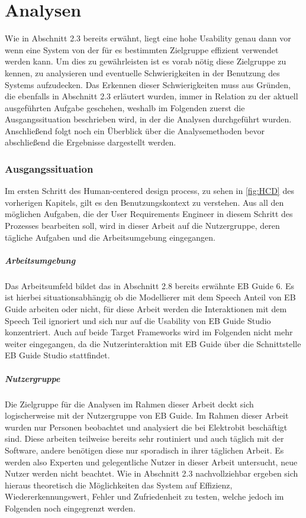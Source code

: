 \chapter{Analysen}\label{ch:method}

Wie in Abschnitt 2.3 bereits erwähnt, liegt eine hohe Usability genau dann vor wenn eine System von der für es bestimmten Zielgruppe effizient verwendet werden kann.\cite{Richter.2016}
Um dies zu gewährleisten ist es vorab nötig diese Zielgruppe zu kennen, zu analysieren und eventuelle Schwierigkeiten in der Benutzung des Systems aufzudecken.
Das Erkennen dieser Schwierigkeiten muss aus Gründen, die ebenfalls in Abschnitt 2.3 erläutert wurden, immer in Relation zu der aktuell ausgeführten Aufgabe geschehen, weshalb im Folgenden zuerst die Ausgangssituation beschrieben wird, in der die Analysen durchgeführt wurden.
Anschließend folgt noch ein Überblick über die Analysemethoden bevor abschließend die Ergebnisse dargestellt werden.

\subsection{Ausgangssituation}
Im ersten Schritt des Human-centered design process, zu sehen in \cref{fig:HCD} des vorherigen Kapitels, gilt es den Benutzungskontext zu verstehen.
Aus all den möglichen Aufgaben, die der User Requirements Engineer in diesem Schritt des Prozesses bearbeiten soll, wird in dieser Arbeit auf die Nutzergruppe, deren tägliche Aufgaben und die Arbeitsumgebung eingegangen.

\paragraph{Arbeitsumgebung}
Das Arbeitsumfeld bildet das in Abschnitt 2.8 bereits erwähnte EB Guide 6.
Es ist hierbei situationsabhängig ob die Modellierer mit dem Speech Anteil von EB Guide arbeiten oder nicht, für diese Arbeit werden die Interaktionen mit dem Speech Teil ignoriert und sich nur auf die Usability von EB Guide Studio konzentriert.
Auch auf beide Target Frameworks wird im Folgenden nicht mehr weiter eingegangen, da die Nutzerinteraktion mit EB Guide über die Schnittstelle EB Guide Studio stattfindet.

\paragraph{Nutzergruppe}
Die Zielgruppe für die Analysen im Rahmen dieser Arbeit deckt sich logischerweise mit der Nutzergruppe von EB Guide.
Im Rahmen dieser Arbeit wurden nur Personen beobachtet und analysiert die bei Elektrobit beschäftigt sind.
Diese arbeiten teilweise bereits sehr routiniert und auch täglich mit der Software, andere benötigen diese nur sporadisch in ihrer täglichen Arbeit.
Es werden also Experten und gelegentliche Nutzer in dieser Arbeit untersucht, neue Nutzer werden nicht beachtet.
Wie in Abschnitt 2.3 nachvollziehbar ergeben sich hieraus theoretisch die Möglichkeiten das System auf Effizienz, Wiedererkennungswert, Fehler und Zufriedenheit zu testen, welche jedoch im Folgenden noch eingegrenzt werden.

